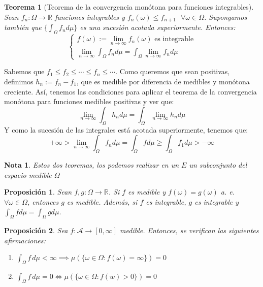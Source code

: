 \documentclass[11pt, a4paper]{article}
\makeatletter
\newif\IfInSansMode
\let\oldsf\sffamily
\renewcommand*{\sffamily}{\oldsf\mathversion{sans}\InSansModetrue}
\let\oldnorm\normalfont
\renewcommand*{\normalfont}{\oldnorm\InSansModefalse\mathversion{normal}}
\newcommand{\R}{\mathbb{R}} \newcommand{\N}{\mathbb{N}}
\renewenvironment{proof}[1][\proofname] {\par\pushQED{\qed}\normalfont\topsep6\p@\@plus6\p@\relax\trivlist\item[\hskip\labelsep\itshape\sffamily#1\@addpunct{.}]\ignorespaces}{\popQED\endtrivlist\@endpefalse}
\theoremstyle{theorem-style}
\newtheorem{nth}{Teorema}[section]
\newtheorem{nprop}{Proposición}[section]
\theoremstyle{definition-style}
\theoremstyle{remark-style}
\newtheorem*{nota}{Nota}
\theoremstyle{example-style}
\newenvironment{nlist}
{\begin{enumerate}
    \renewcommand\labelenumi{(\emph{\roman{enumi})}}}
  {\end{enumerate}}
\makeatother
\begin{document}
\begin{nth}[Teorema de la convergencia monótona para funciones integrables]
  Sean $f_n: \Omega \to \R$ funciones integrables y $f_n(\omega) \leq f_{n+1} \ \ \ \forall \omega \in \Omega$. Supongamos también que $\{\int_\Omega f_n d\mu\}$ es una sucesión acotada superiormente. Entonces: 
  $$ \begin{cases}
    f(\omega):= \lim_{n\to \infty}f_n(\omega) \text{ es integrable}\\
    \lim_{n \to \infty} \int_\Omega f_n d\mu = \int_{\Omega}\lim_{n\to \infty} f_n d\mu
  \end{cases}$$
  
\end{nth}
\begin{proof}
  Sabemos que $f_1 \leq f_2 \leq \cdots \leq f_n \leq \cdots $. Como queremos que sean positivas, definimos $h_n:= f_n - f_1$, que es medible por diferencia de medibles y monótona creciente. Así, tenemos las condiciones para aplicar el teorema de la convergencia monótona para funciones medibles positivas y ver que:
  $$ \lim_{n \to \infty} \int_\Omega h_n d\mu = \int_\Omega \lim_{n \to \infty}h_n d\mu$$
  Y como la sucesión de las integrales está acotada superiormente, tenemos que:
  $$ +\infty > \lim_{n\to \infty} \int_\Omega f_n d\mu = \int_\Omega f d\mu \geq \int_\Omega f_1 d\mu > -\infty$$
\end{proof}

\begin{nota}
  Estos dos teoremas, los podemos realizar en un $E$ un subconjunto del espacio medible $\Omega$
\end{nota}

\begin{nprop}
  Sean $f,g: \Omega \to \R$. Si $f$ es medible y $f(\omega) =  g(\omega)$ a. e. $\forall \omega \in \Omega$, entonces $g$ es medible. Además, si $f$ es integrable, $g$ es integrable y $\int_\Omega f d\mu = \int_\Omega g d\mu$.
\end{nprop}

\begin{nprop} Sea $f:\mathscr A \to [0,\infty]$ medible. Entonces, se verifican las siguientes afirmaciones:
  \begin{nlist}
	
  \item $\displaystyle \int_\Omega f\, d\mu < \infty \implies \mu(\{\omega \in \Omega: f(\omega) =  \infty\}) = 0$
  \item $\displaystyle \int_\Omega f\, d\mu = 0 \iff \mu(\{\omega \in \Omega : f(w) > 0\}) = 0$
\end{nlist}
\end{nprop}
\end{document}
